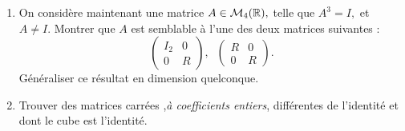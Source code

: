 \documentclass[12pt,a4paper]{article}
\begin{document}
\begin{enumerate}
\item  On considère maintenant une matrice $A\in {\cal M}_4(\mathbb
  R),$ telle que $A^3=I,$ et $A\neq I.$ Montrer que $A$ est semblable
  à l'une des deux matrices suivantes :
$$\left(\begin{array}{cc}I_2&0\\0&R
  \end{array}\right),\;\;\left(\begin{array}{cc}R&0\\0&R
  \end{array}\right).$$  Généraliser ce résultat en dimension
quelconque.
\item Trouver des matrices carrées ,{\it à coefficients entiers},
  différentes de l'identité et dont le cube est l'identité.
\end{enumerate}
\end{document}
